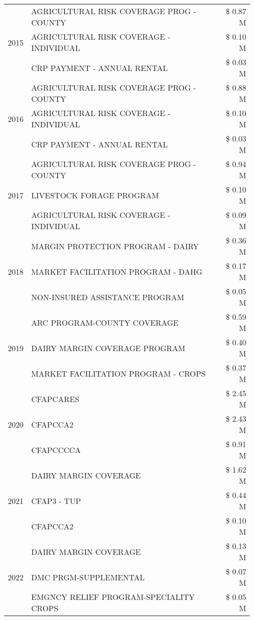 \begin{tabular}{llr}
\cline{1-3}
\multirow[t]{3}{*}{2015} & AGRICULTURAL RISK COVERAGE PROG - COUNTY & \$ 0.87 M \\
 & AGRICULTURAL RISK COVERAGE - INDIVIDUAL & \$ 0.10 M \\
 & CRP PAYMENT - ANNUAL RENTAL & \$ 0.03 M \\
\cline{1-3}
\multirow[t]{3}{*}{2016} & AGRICULTURAL RISK COVERAGE PROG - COUNTY & \$ 0.88 M \\
 & AGRICULTURAL RISK COVERAGE - INDIVIDUAL & \$ 0.10 M \\
 & CRP PAYMENT - ANNUAL RENTAL & \$ 0.03 M \\
\cline{1-3}
\multirow[t]{3}{*}{2017} & AGRICULTURAL RISK COVERAGE PROG - COUNTY & \$ 0.94 M \\
 & LIVESTOCK FORAGE PROGRAM & \$ 0.10 M \\
 & AGRICULTURAL RISK COVERAGE - INDIVIDUAL & \$ 0.09 M \\
\cline{1-3}
\multirow[t]{3}{*}{2018} & MARGIN PROTECTION PROGRAM - DAIRY & \$ 0.36 M \\
 & MARKET FACILITATION PROGRAM - DAHG & \$ 0.17 M \\
 & NON-INSURED ASSISTANCE PROGRAM & \$ 0.05 M \\
\cline{1-3}
\multirow[t]{3}{*}{2019} & ARC PROGRAM-COUNTY COVERAGE & \$ 0.59 M \\
 & DAIRY MARGIN COVERAGE PROGRAM & \$ 0.40 M \\
 & MARKET FACILITATION PROGRAM - CROPS & \$ 0.37 M \\
\cline{1-3}
\multirow[t]{3}{*}{2020} & CFAPCARES & \$ 2.45 M \\
 & CFAPCCA2 & \$ 2.43 M \\
 & CFAPCCCCA & \$ 0.91 M \\
\cline{1-3}
\multirow[t]{3}{*}{2021} & DAIRY MARGIN COVERAGE & \$ 1.62 M \\
 & CFAP3 - TUP & \$ 0.44 M \\
 & CFAPCCA2 & \$ 0.10 M \\
\cline{1-3}
\multirow[t]{3}{*}{2022} & DAIRY MARGIN COVERAGE & \$ 0.13 M \\
 & DMC PRGM-SUPPLEMENTAL & \$ 0.07 M \\
 & EMGNCY RELIEF PROGRAM-SPECIALITY CROPS & \$ 0.05 M \\
\cline{1-3}
\bottomrule
\end{tabular}

